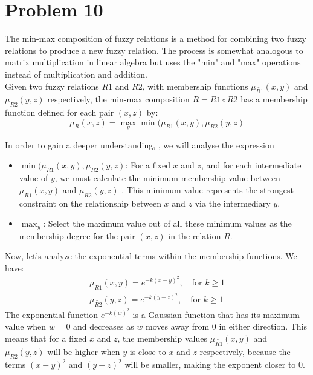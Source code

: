 \section{Problem 10}
The min-max composition of fuzzy relations is a method for combining two fuzzy relations to produce a new fuzzy relation. The process is somewhat analogous to matrix multiplication in linear algebra but uses the "min" and "max" operations instead of multiplication and addition. \\
Given two fuzzy relations $R1$ and $R2$, with membership functions $\mu_{\tilde{R1}}(x,y)$ and $\mu_{\tilde{R2}}(y,z)$ respectively, the min-max composition $R = R1 \circ R2 $ has a membership function defined for each pair $(x,z)$ by:
\begin{equation}
	\mu_R(x, z) = \max_{y} \min(\mu_{R1}(x, y), \mu_{R2}(y, z)
\end{equation}

In order to gain a deeper understanding, , we will analyse the expression
\begin{itemize}
	\item $\min(\mu_{R1}(x, y), \mu_{R2}(y, z)$: For a fixed $x$ and $z$, and for each intermediate value of $y$, we must calculate the minimum membership value between 
	$\mu_{\tilde{R1}}(x,y)$ and $\mu_{\tilde{R2}}(y,z)$ . This minimum value represents the strongest constraint on the relationship between $x$ and $z$ via the intermediary $y$.
	\item $\max_{y} $: Select the maximum value out of all these minimum values as the membership degree for the pair $(x,z)$ in the relation $R$.
\end{itemize}

Now, let's analyze the exponential terms within the membership functions. We have:
\begin{align}
	\mu_{\tilde{R1}}(x,y) = e^{-k(x - y)^2}, \quad \text{for } k \geq 1 \\
	\mu_{\tilde{R2}}(y,z) = e^{-k(y - z)^2}, \quad \text{for } k \geq 1
\end{align}
The exponential function $e^{-k(w)^2}$  is a Gaussian function that has its maximum value when 
$w=0$ and decreases as $w$ moves away from $0$ in either direction. This means that for a fixed 
$x$ and $z$, the membership values $\mu_{\tilde{R1}}(x,y)$ and $\mu_{\tilde{R2}}(y,z)$ will be higher when $y$ is close to $x$ and $z$ respectively, because the terms $(x-y)^2$ and $(y-z)^2$ will be smaller, making the exponent closer to $0$.\\

